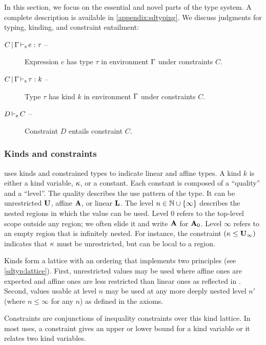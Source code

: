 In this section, we focus on the essential and novel parts of the type system. A complete
description is available in \cref{appendix:sdtyping}.
%
We discuss judgments for typing, kinding, and constraint entailment:
\begin{description}
\item[$C \operatorname{|} \Gamma \operatorname{\vdash_s} e : \tau$ --]
  Expression $e$ has type $\tau$ in environment $\Gamma$ under constraints $C$.
\item[$C \operatorname{|} \Gamma \operatorname{\vdash_s} \tau : k$ --]
  Type $\tau$ has kind $k$ in environment $\Gamma$ under constraints $C$.
\item[$D \operatorname{\vdash_e} C$ --] Constraint $D$ entails constraint $C$.
\end{description}

\subsubsection{Kinds and constraints}

\affe uses kinds and constrained types to indicate
linear and affine types.
A kind $k$ is either a kind variable, $\kappa$, or a constant.
Each constant is composed of a ``quality'' and a ``level''.
The quality describes the use pattern of the type. It can be
unrestricted $\mathbf{U}$, affine $\mathbf{A}$, or linear $\mathbf{L}$. The level  $n \in \mathbb{N} \cup \{\infty\}$
describes the nested regions in which the value can be used.
Level $0$ refers to the top-level scope outside any region; we often elide it
and write $\mathbf{A}$ for $\mathbf{A}_0$. Level
$\infty$ refers to an empty region that is infinitely nested.
For instance, the constraint $(\kappa \leq \mathbf{U}_\infty)$ indicates that
$\kappa$ must be unrestricted, but can be local to a region.

Kinds form a lattice with an ordering that implements two principles
(see \cref{sdtyp:lattice}). First, unrestricted values may be used
where affine ones are expected and affine ones are less restricted
than linear ones as reflected in .
Second, values usable at level $n$ may be used at any more deeply
nested level $n'$ (where $n\le\infty$ for any $n$) as defined in the  axioms.

Constraints are conjunctions of inequality constraints over this kind
lattice. In most uses, a constraint gives an upper or lower bound for
a kind variable or it relates two kind variables.

